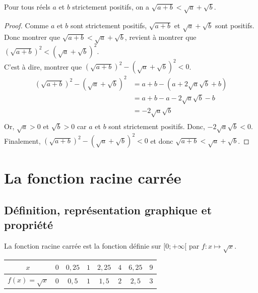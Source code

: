 \begin{Propriété}
Pour tous réels $a$ et $b$ strictement positifs, on a $\sqrt{a+b} < \sqrt{a} +\sqrt{b}$.

\end{Propriété}

\begin{proof}
Comme $a$ et $b$ sont strictement positifs, $\sqrt{a+b}$ et $ \sqrt{a} +\sqrt{b}$ sont positifs. \\
Donc montrer que $\sqrt{a+b} < \sqrt{a} +\sqrt{b}$, revient à montrer que $\left(\sqrt{a+b}\right)^2 < \left(\sqrt{a} +\sqrt{b}\right)^2$. \\
C'est à dire, montrer que $\left(\sqrt{a+b}\right)^2 -\left(\sqrt{a} +\sqrt{b}\right)^2 <0$. 
\begin{align*}
\left(\sqrt{a+b}\right)^2 -\left(\sqrt{a} +\sqrt{b}\right)^2 &= a+b -(a+2\sqrt{a}\sqrt{b}+b) \\
&=a+b -a-2\sqrt{a}\sqrt{b}-b \\
&=-2\sqrt{a}\sqrt{b}\\
\end{align*}
Or, $\sqrt{a}>0$ et $\sqrt{b}>0$ car $a$ et $b$ sont strictement positifs. Donc, $-2\sqrt{a}\sqrt{b}<0$.\\
Finalement, $\left(\sqrt{a+b}\right)^2 -\left(\sqrt{a} +\sqrt{b}\right)^2 <0$ et donc $\sqrt{a+b} < \sqrt{a} +\sqrt{b}$.


\end{proof}



\newpage

\section{La fonction racine carrée}
\subsection{Définition, représentation graphique et propriété}

\begin{Définition}
La fonction racine carrée est la fonction définie sur $[0;+\infty[$ par $f:x\mapsto \sqrt{x}$.

\end{Définition}

\begin{center}

\begin{tabular}{|c|c|c|c|c|c|c|c|}
\hline
$x$ & $0$ & $0,25$ & $1$ & $2,25$ & $4$ & $6,25$ & $9$ \\
\hline
$f(x)=\sqrt{x}$ & $0$ & $0,5$ & $1$ & $1,5$ & $2$ & $2,5$ & $3$ \\
\hline

\end{tabular}
\end{center}

